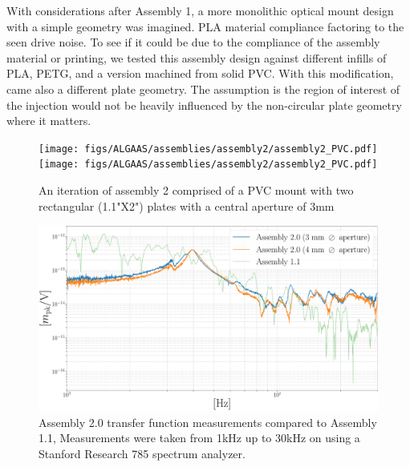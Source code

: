 With considerations after Assembly 1, a more monolithic optical mount design with a simple geometry was imagined. PLA material compliance factoring to the seen drive noise. To see if it could be due to the compliance of the assembly material or printing, we tested this assembly design against different infills of PLA, PETG, and a version machined from solid PVC. With this modification, came also a different plate geometry. The assumption is the region of interest of the injection would not be heavily influenced by the non-circular plate geometry where it matters.


\begin{figure}[!h]
	\begin{subcaptiongroup}
		\texttt{[image: figs/ALGAAS/assemblies/assembly2/assembly2\_PVC.pdf]}
		\label{A2_PVC}
		\texttt{[image: figs/ALGAAS/assemblies/assembly2/assembly2\_PVC.pdf]}
		\label{A2_PVC}
    	\end{subcaptiongroup}
    \caption{An iteration of assembly 2 comprised of a PVC mount with two rectangular (1.1"X2") plates with a central aperture of 3mm}
    \label{fig:assembly2}
\end{figure}

\begin{figure}[H]
    \includegraphics[width=\textwidth]{figs/ALGAAS/results_figs/assembly2/2_0_compare_1_1.pdf} 
    \caption{Assembly 2.0 transfer function measurements compared to Assembly 1.1, Measurements were taken from 1kHz up to 30kHz on using a Stanford Research 785 spectrum analyzer.}
    \label{fig:assembly2and1_1}
\end{figure}


